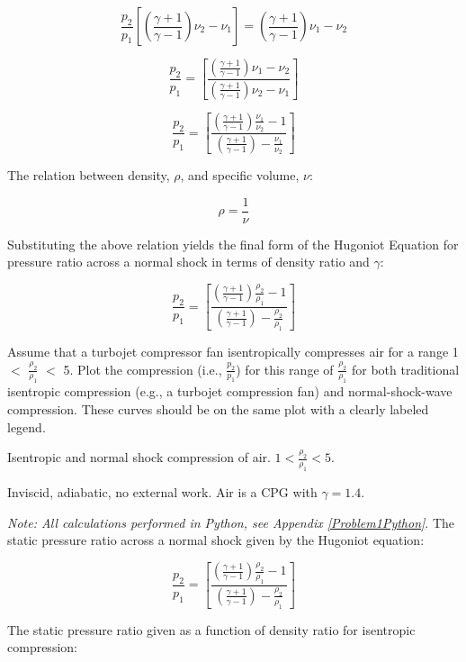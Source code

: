 \documentclass[../main.tex]{subfiles}
\begin{document}
\[
    \frac{p_2}{p_1} \left[{\left({\frac{\gamma+1}{\gamma-1}}\right) \nu_2 - \nu_1 }\right] =
    \left({\frac{\gamma+1}{\gamma-1}}\right) \nu_1 - \nu_2
\]

\[
    \frac{p_2}{p_1} = \left[{
        \frac{\left({\frac{\gamma+1}{\gamma-1}}\right) \nu_1 - \nu_2}{{\left({\frac{\gamma+1}{\gamma-1}}\right) \nu_2 - \nu_1 }}
    }\right]
\]

\[
    \frac{p_2}{p_1} = \left[{
        \frac{\left({\frac{\gamma+1}{\gamma-1}}\right) \frac{\nu_1}{\nu_2} - 1}{{\left({\frac{\gamma+1}{\gamma-1}}\right) - \frac{\nu_1}{\nu_2} }}
    }\right]
\]

The relation between density, \(\rho\), and specific volume, \(\nu\):

\[
    \rho = \frac{1}{\nu}
\]

Substituting the above relation yields the final form of the Hugoniot Equation for pressure ratio across a normal shock in terms of density ratio and \(\gamma\):

\[
    \boxed{
    \frac{p_2}{p_1} = \left[{
        \frac{\left({\frac{\gamma+1}{\gamma-1}}\right) \frac{\rho_2}{\rho_1} - 1}{{\left({\frac{\gamma+1}{\gamma-1}}\right) - \frac{\rho_2}{\rho_1} }}
    }\right]
    }
\]


Assume that a turbojet compressor fan isentropically compresses air for a range 1 \(<\) \(\frac{\rho_2}{\rho_1}\) \(<\) 5. 
Plot the compression (i.e., \(\frac{p_2}{p_1}\)) for this range of \(\frac{\rho_2}{\rho_1}\) for both traditional isentropic compression (e.g., a turbojet compression fan) and normal-shock-wave compression. 
These curves should be on the same plot with a clearly labeled legend.

\givens{}
Isentropic and normal shock compression of air.
\(1 < \frac{\rho_2}{\rho_1} < 5\).

\assumptions{}
Inviscid, adiabatic, no external work. Air is a CPG with \(\gamma =1.4\).

\solution{}
\textit{Note: All calculations performed in Python, see Appendix \ref{Problem1Python}}.
The static pressure ratio across a normal shock given by the Hugoniot equation:

\[
    \frac{p_2}{p_1} = \left[{
        \frac{\left({\frac{\gamma+1}{\gamma-1}}\right) \frac{\rho_2}{\rho_1} - 1}{{\left({\frac{\gamma+1}{\gamma-1}}\right) - \frac{\rho_2}{\rho_1} }}
    }\right]
\]

The static pressure ratio given as a function of density ratio for isentropic compression:
\end{document}
